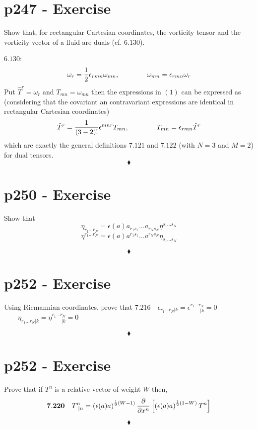 \section{p247 - Exercise }
\begin{tcolorbox}
Show that, for rectangular Cartesian coordinates, the vorticity tensor and the vorticity vector of a fluid are duals (cf. $\mathbf{6.130}$).
\end{tcolorbox}
$\mathbf{6.130}$:
\begin{align}
\omega_r=\frac{1}{2}\epsilon_{rmn}\omega_{mn},\quad\quad\quad\quad \omega_{mn}=\epsilon_{rmn}\omega_r
\end{align}
Put $\hat{T}^r= \omega_r$ and $T_{mn} = \omega_{mn}$
then the expressions in $(1)$ can be expressed as (considering that the covariant an contravariant expressions are identical in rectangular Cartesian coordinates) 
\begin{align}
\hat{T}^r=\frac{1}{(3-2)!}\epsilon^{mnr}T_{mn},\quad\quad\quad\quad T_{mn}=\epsilon_{rmn}\hat{T}^r
\end{align}
which are exactly the general definitions $\mathbf{7.121}$ and $\mathbf{7.122}$ (with $N=3$ and $M=2$) for dual tensors.
$$\blacklozenge$$
\newpage


\section{p250 - Exercise }
\begin{tcolorbox}
Show that
$$\eta_{r_1\dots r_N}= \epsilon(a)a_{r_1s_1}\dots a_{r_Ns_N}\eta^{s_1\dots s_N}$$
$$\eta^{r_1\dots r_N}= \epsilon(a)a^{r_1s_1}\dots a^{r_Ns_N}\eta_{s_1\dots s_N}$$
\end{tcolorbox}
$$\blacklozenge$$
\newpage

\section{p252 - Exercise }
\begin{tcolorbox}
Using Riemannian coordinates, prove that 
$\mathbf{7.216}\quad \epsilon_{r_1\dots r_N|k}=\epsilon^{r_1\dots r_N}_{\quad\quad |k}=0$
$\quad \quad \eta_{r_1\dots r_N|k}= \eta^{r_1\dots r_N}_{\quad\quad|k}=0$
\end{tcolorbox}
$$\blacklozenge$$
\newpage




\section{p252 - Exercise }
\begin{tcolorbox}
Prove that if $T^n$ is a relative vector of weight $W$ then,
$$\mathbf{7.220} \quad T^n_{\ |n}= \left(\epsilon(a)a\right)^{\frac{1}{2}(W-1)}\pdv{}{x^n}\left[\left(\epsilon(a)a\right)^{\frac{1}{2}(1-W)}T^n\right]$$ 
\end{tcolorbox}
$$\blacklozenge$$
\newpage

